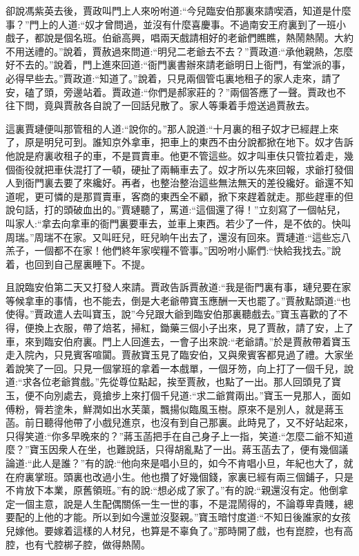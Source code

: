 


\begin{parag}
    卻說馮紫英去後，賈政叫門上人來吩咐道:“今兒臨安伯那裏來請喫酒，知道是什麼事？”門上的人道:“奴才曾問過，並沒有什麼喜慶事。不過南安王府裏到了一班小戲子，都說是個名班。伯爺高興，唱兩天戲請相好的老爺們瞧瞧，熱鬧熱鬧。大約不用送禮的。”說着，賈赦過來問道:“明兒二老爺去不去？”賈政道:“承他親熱，怎麼好不去的。”說着，門上進來回道:“衙門裏書辦來請老爺明日上衙門，有堂派的事，必得早些去。”賈政道:“知道了。”說着，只見兩個管屯裏地租子的家人走來，請了安，磕了頭，旁邊站着。賈政道:“你們是郝家莊的？”兩個答應了一聲。賈政也不往下問，竟與賈赦各自說了一回話兒散了。家人等秉着手燈送過賈赦去。
\end{parag}


\begin{parag}
    這裏賈璉便叫那管租的人道:“說你的。”那人說道:“十月裏的租子奴才已經趕上來了，原是明兒可到。誰知京外拿車，把車上的東西不由分說都掀在地下。奴才告訴他說是府裏收租子的車，不是買賣車。他更不管這些。奴才叫車伕只管拉着走，幾個衙役就把車伕混打了一頓，硬扯了兩輛車去了。奴才所以先來回報，求爺打發個人到衙門裏去要了來纔好。再者，也整治整治這些無法無天的差役纔好。爺還不知道呢，更可憐的是那買賣車，客商的東西全不顧，掀下來趕着就走。那些趕車的但說句話，打的頭破血出的。”賈璉聽了，罵道:“這個還了得！”立刻寫了一個帖兒，叫家人:“拿去向拿車的衙門裏要車去，並車上東西。若少了一件，是不依的。快叫周瑞。”周瑞不在家。又叫旺兒，旺兒晌午出去了，還沒有回來。賈璉道:“這些忘八羔子，一個都不在家！他們終年家喫糧不管事。”因吩咐小廝們:“快給我找去。”說着，也回到自己屋裏睡下。不提。
\end{parag}


\begin{parag}
    且說臨安伯第二天又打發人來請。賈政告訴賈赦道:“我是衙門裏有事，璉兒要在家等候拿車的事情，也不能去，倒是大老爺帶寶玉應酬一天也罷了。”賈赦點頭道:“也使得。”賈政遣人去叫寶玉，說”今兒跟大爺到臨安伯那裏聽戲去。”寶玉喜歡的了不得，便換上衣服，帶了焙茗，掃紅，鋤藥三個小子出來，見了賈赦，請了安，上了車，來到臨安伯府裏。門上人回進去，一會子出來說:“老爺請。”於是賈赦帶着寶玉走入院內，只見賓客喧闐。賈赦寶玉見了臨安伯，又與衆賓客都見過了禮。大家坐着說笑了一回。只見一個掌班的拿着一本戲單，一個牙笏，向上打了一個千兒，說道:“求各位老爺賞戲。”先從尊位點起，挨至賈赦，也點了一出。那人回頭見了寶玉，便不向別處去，竟搶步上來打個千兒道:“求二爺賞兩出。”寶玉一見那人，面如傅粉，脣若塗朱，鮮潤如出水芙蕖，飄揚似臨風玉樹。原來不是別人，就是蔣玉菡。前日聽得他帶了小戲兒進京，也沒有到自己那裏。此時見了，又不好站起來，只得笑道:“你多早晚來的？”蔣玉菡把手在自己身子上一指，笑道:“怎麼二爺不知道麼？”寶玉因衆人在坐，也難說話，只得胡亂點了一出。蔣玉菡去了，便有幾個議論道:“此人是誰？”有的說:“他向來是唱小旦的，如今不肯唱小旦，年紀也大了，就在府裏掌班。頭裏也改過小生。他也攢了好幾個錢，家裏已經有兩三個鋪子，只是不肯放下本業，原舊領班。”有的說:“想必成了家了。”有的說:“親還沒有定。他倒拿定一個主意，說是人生配偶關係一生一世的事，不是混鬧得的，不論尊卑貴賤，總要配的上他的才能。所以到如今還並沒娶親。”寶玉暗忖度道:“不知日後誰家的女孩兒嫁他。要嫁着這樣的人材兒，也算是不辜負了。”那時開了戲，也有崑腔，也有高腔，也有弋腔梆子腔，做得熱鬧。
\end{parag}


